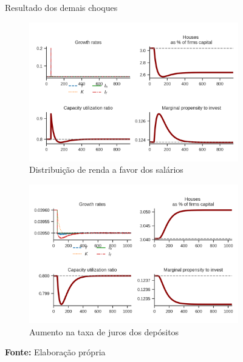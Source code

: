 \begin{figure}[htb]
     \centering
     \caption{Resultado dos demais choques}
     \begin{subfigure}[b]{0.45\textwidth}
         \centering
        \caption{Distribuição de renda a favor dos salários}
        \label{choque_2}
        \includegraphics[width = 1\textwidth]{../../Modelo/Versoes/Shock_2.png}
     \end{subfigure}
     \hfill
     \begin{subfigure}[b]{0.45\textwidth}
         \centering
         \caption{Aumento na taxa de juros dos depósitos}
         \label{choque_3}
         \includegraphics[width = 1\textwidth]{../../Modelo/Versoes/Shock_3.png}
     \end{subfigure}
        \caption*{\textbf{Fonte:} Elaboração própria}
        \label{choques}
\end{figure}



